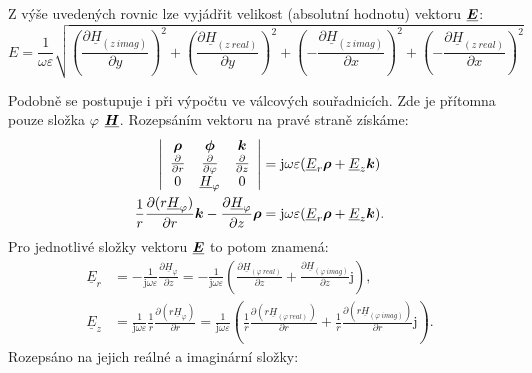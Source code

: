 \documentclass[12pt,a4paper,oneside]{article}
\numberwithin{equation}{section} %
\numberwithin{figure}{section} %
\numberwithin{table}{section} %
\newcommand{\mj}{\mathrm{j}} %
\renewcommand{\vec}[1]{\mbox{\boldmath$#1$}} %
\newcommand{\faz}[1]{{\underline{#1}}} %
\begin{document}
Z výše uvedených rovnic lze vyjádřit velikost (absolutní hodnotu) vektoru $\faz{\vec{E}}$:
\begin{equation}
E = \frac{1}{\omega \varepsilon} \sqrt{\left( \frac{\partial \faz{H} _{(z~imag)}}{\partial y} \right) ^2 + \left( \frac{\partial \faz{H} _{(z~real)}}{\partial y} \right) ^2 + \left( - \frac{\partial \faz{H} _{(z~imag)}}{\partial x} \right) ^2 + \left( - \frac{\partial \faz{H} _{(z~real)}}{\partial x} \right) ^2}
\end{equation}

Podobně se postupuje i při výpočtu ve válcových  souřadnicích. Zde je přítomna pouze složka $\varphi$ $\faz{\vec{H}}$. Rozepsáním vektoru na pravé straně získáme:
\begin{subequations}
\begin{align}
\left| 
\begin{array}{c c c}
\vec{\rho} & \vec{\phi} & \vec{k} \\ 
\frac{\partial}{\partial r} & \frac{\partial}{\partial \varphi} & \frac{\partial}{\partial z} \\
0 & \faz{H} _{\varphi} & 0
\end{array}
\right|
&= \mj \omega \varepsilon (\faz{E} _r \vec{\rho} + \faz{E} _z \vec{k})
\\
\frac{1}{r} \frac{\partial (r \faz{H} _{\varphi} )}{\partial r} \vec{k} - \frac{\partial \faz{H} _{\varphi}}{\partial z} \vec{\rho} &= \mj \omega \varepsilon (\faz{E} _r \vec{\rho} + \faz{E} _z \vec{k}) .
\end{align}
\end{subequations}
Pro jednotlivé složky vektoru $\faz{\vec{E}}$ to potom znamená:
\begin{subequations}
\begin{align}
\faz{E} _r &= - \frac{1}{\mj \omega \varepsilon} \frac{\partial \faz{H} _{\varphi}}{\partial z} = - \frac{1}{\mj \omega \varepsilon} ( \frac{\partial \faz{H} _{(\varphi ~ real)}}{\partial z} + \frac{\partial \faz{H} _{(\varphi ~ imag)}}{\partial z} \mj ) ,
\\
\faz{E} _z &= \frac{1}{\mj \omega \varepsilon} \frac{1}{r} \frac{\partial (r \faz{H} _{\varphi})}{\partial r} = \frac{1}{\mj \omega \varepsilon} ( \frac{1}{r} \frac{\partial (r \faz{H} _{(\varphi ~ real)})}{\partial r} + \frac{1}{r} \frac{\partial (r \faz{H} _{(\varphi ~ imag)})}{\partial r} \mj ) .
\end{align}
\end{subequations}
Rozepsáno na jejich reálné a imaginární složky:
\end{document}
